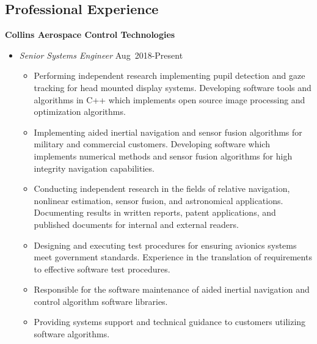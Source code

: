 \subsection*{Professional Experience}
{}

\textbf{Collins Aerospace Control Technologies}

\begin{itemize}
    \item[] \textit{Senior Systems Engineer} \hfill {Aug~2018-Present} 
        \begin{itemize}
            \item Performing independent research implementing pupil detection and gaze tracking for head mounted display systems. 
                Developing software tools and algorithms in C++ which implements open source image processing and optimization algorithms.
            \item Implementing aided inertial navigation and sensor fusion algorithms for military and commercial customers. 
                Developing software which implements numerical methods and sensor fusion algorithms for high integrity navigation capabilities.
            \item Conducting independent research in the fields of relative navigation, nonlinear estimation, sensor fusion, and astronomical applications.
                Documenting results in written reports, patent applications, and published documents for internal and external readers. 
            \item Designing and executing test procedures for ensuring avionics systems meet government standards.
                Experience in the translation of requirements to effective software test procedures.
            \item Responsible for the software maintenance of aided inertial navigation and control algorithm software libraries. 
            \item Providing systems support and technical guidance to customers utilizing software algorithms.
        \end{itemize}
\end{itemize}

